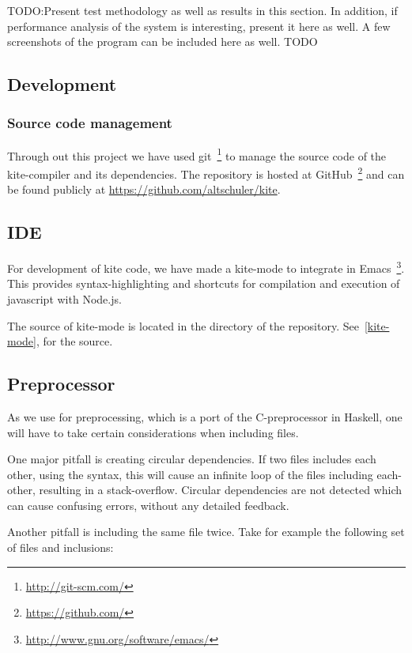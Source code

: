 
TODO:Present test methodology as well as results in this section. In addition, if performance
analysis of the system is interesting, present it here as well.
A few screenshots of the program can be included here as well. TODO


\subsection{Development}
\subsubsection{Source code management}
Through out this project we have used
git~\footnote{\url{http://git-scm.com/}} to manage the source code of
the kite-compiler and its dependencies. The repository is hosted at
GitHub~\footnote{\url{https://github.com/}} and can be found publicly at
\url{https://github.com/altschuler/kite}.

\subsection{IDE}
For development of kite code, we have made a kite-mode to integrate in
Emacs~\footnote{\url{http://www.gnu.org/software/emacs/}}. This
provides syntax-highlighting and shortcuts for compilation and
execution of javascript with Node.js.

The source of kite-mode is located in the  directory of
the repository. See~\ref{kite-mode}, for the source.


\subsection{Preprocessor}
As we use \cite{wallace04} for preprocessing, which is a
port of the C-preprocessor in Haskell, one will have to take certain
considerations when including files.

One major pitfall is creating circular dependencies. If two files includes
each other, using the  syntax, this will
cause an infinite loop of the files including each-other, resulting in
a stack-overflow. Circular dependencies are not detected which can
cause confusing errors, without any detailed feedback.

Another pitfall is including the same file twice. Take for example the
following set of files and inclusions:

